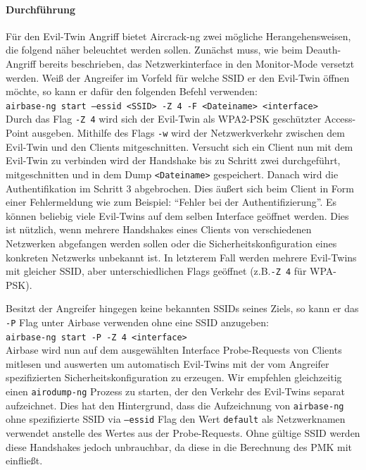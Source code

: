 \paragraph{Durchführung}
Für den Evil-Twin Angriff bietet Aircrack-ng zwei mögliche Herangehensweisen, die folgend näher beleuchtet werden sollen.
Zunächst muss, wie beim Deauth-Angriff bereits beschrieben, das Netzwerkinterface in den Monitor-Mode versetzt werden.
Weiß der Angreifer im Vorfeld für welche SSID er den Evil-Twin öffnen möchte, so kann er dafür den folgenden Befehl verwenden:
\\\texttt{airbase-ng start --essid <SSID> -Z 4 -F <Dateiname> <interface>}\\
Durch das Flag \texttt{-Z 4} wird sich der Evil-Twin als WPA2-PSK geschützter Access-Point ausgeben.
Mithilfe des Flags \texttt{-w} wird der Netzwerkverkehr zwischen dem Evil-Twin und den Clients mitgeschnitten.
Versucht sich ein Client nun mit dem Evil-Twin zu verbinden wird der Handshake bis zu Schritt zwei durchgeführt, mitgeschnitten und in dem Dump \texttt{<Dateiname>} gespeichert.
Danach wird die Authentifikation im Schritt 3 abgebrochen.
Dies äußert sich beim Client in Form einer Fehlermeldung wie zum Beispiel: \enquote{Fehler bei der Authentifizierung}.
Es können beliebig viele Evil-Twins auf dem selben Interface geöffnet werden. 
Dies ist nützlich, wenn mehrere Handshakes eines Clients von verschiedenen Netzwerken abgefangen werden sollen oder die Sicherheitskonfiguration eines konkreten Netzwerks unbekannt ist.
In letzterem Fall werden mehrere Evil-Twins mit gleicher SSID, aber unterschiedlichen Flags geöffnet (z.B.\texttt{-Z 4} für WPA-PSK). %


Besitzt der Angreifer hingegen keine bekannten SSIDs seines Ziels, so kann er das \texttt{-P} Flag unter Airbase verwenden ohne eine SSID anzugeben:
\\\texttt{airbase-ng start -P -Z 4 <interface>}\\
Airbase wird nun auf dem ausgewählten Interface Probe-Requests von Clients mitlesen und auswerten um automatisch Evil-Twins mit der vom Angreifer spezifizierten Sicherheitskonfiguration zu erzeugen.
Wir empfehlen gleichzeitig einen \texttt{airodump-ng} Prozess zu starten, der den Verkehr des Evil-Twins separat aufzeichnet.
Dies hat den Hintergrund, dass die Aufzeichnung von \texttt{airbase-ng} ohne spezifizierte SSID via \texttt{--essid} Flag den Wert \texttt{default} als Netzwerknamen verwendet anstelle des Wertes aus der Probe-Requests.
Ohne gültige SSID werden diese Handshakes jedoch unbrauchbar, da diese in die Berechnung des PMK mit einfließt.

